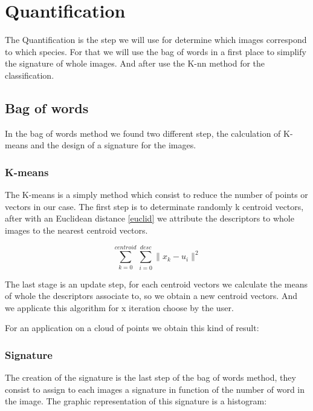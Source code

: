 \documentclass[12pt]{article}
\begin{document}
\section{Quantification}

The Quantification is the step we will use for determine which images correspond to which species. For that we will use the bag of words in a first place to simplify the signature of whole images. And after use the K-nn method for the classification.

\subsection{Bag of words}

In the bag of words method we found two different step, the calculation of K-means and the design of a signature for the images.

\subsubsection{K-means}

The K-means is a simply method which consist to reduce the number of points or vectors in our case. The first step is to determinate randomly k centroid vectors, after with an Euclidean distance \eqref{euclid} we attribute the descriptors to whole images to the nearest centroid vectors.

\begin{equation}
\sum_{k=0}^{centroid}\sum_{i=0}^{desc}\parallel x_k - u_i \parallel ^2
\label{euclid}
\end{equation}

The last stage is an update step, for each centroid vectors we calculate the means of whole the descriptors associate to, so we obtain a new centroid vectors. And we applicate this algorithm for x iteration choose by the user.

For an application on a cloud of points we obtain this kind of result:



\subsubsection{Signature}

The creation of the signature is the last step of the bag of words method, they consist to assign to each images a signature in function of the number of word in the image. The graphic representation of this signature is a histogram:
\end{document}
